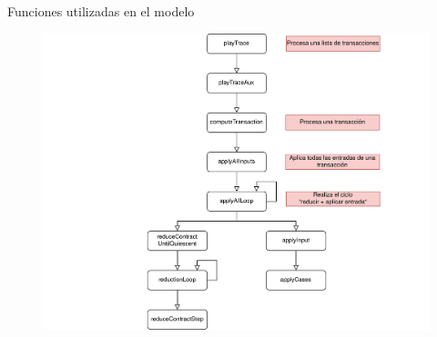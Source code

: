 \documentclass{beamer}
\begin{document}
{\begin{frame}[fragile]{Funciones utilizadas en el modelo}
{\begin{figure}[H]
        \includegraphics[height=0.8\textheight]{Dependencias_Isabelle_Marlowe_4.png}
    \end{figure}
}
\end{frame}}
\end{document}
